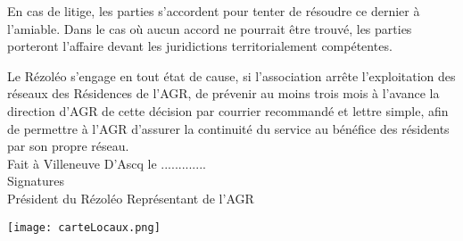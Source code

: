 \documentclass[12pt]{constitution}
\begin{document}
    En cas de litige, les parties s'accordent pour tenter de résoudre ce dernier à l'amiable. Dans le cas où aucun accord ne pourrait être trouvé, les parties porteront l'affaire devant les juridictions territorialement compétentes.


    Le Rézoléo s'engage en tout état de cause, si l'association arrête l'exploitation des réseaux des Résidences de l'AGR, de prévenir au moins trois mois à l'avance la direction d'AGR de cette décision par courrier recommandé et lettre simple, afin de permettre à l'AGR d'assurer la continuité du service au bénéfice des résidents par son propre réseau.\\

Fait à Villeneuve D'Ascq le .............\\


\noindent Signatures \\
Président du Rézoléo \hfill Représentant de l'AGR

    \newpage

    \texttt{[image: carteLocaux.png]}
\end{document}
